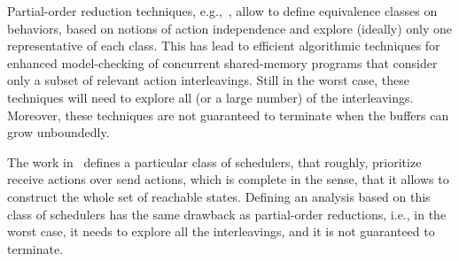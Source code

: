 Partial-order reduction techniques, e.g.,~\cite{DBLP:conf/popl/AbdullaAJS14,DBLP:conf/popl/FlanaganG05}, allow to define equivalence classes on behaviors, based on notions of action independence and explore (ideally) only one representative of each class. This has lead to efficient algorithmic techniques for enhanced model-checking of concurrent shared-memory programs that consider only a subset of relevant action interleavings. Still in the worst case, these techniques will need to explore all (or a large number) of the interleavings. Moreover, these techniques are not guaranteed to terminate when the buffers can grow unboundedly.

The work in~\cite{DBLP:conf/oopsla/Desai0M14} defines a particular class of schedulers, that roughly, prioritize receive actions over send actions, which is complete in the sense, that it allows to construct the whole set of reachable states. Defining an analysis based on this class of schedulers has the same drawback as partial-order reductions, i.e., in the worst case, it needs to explore all the interleavings, and it is not guaranteed to terminate. 
